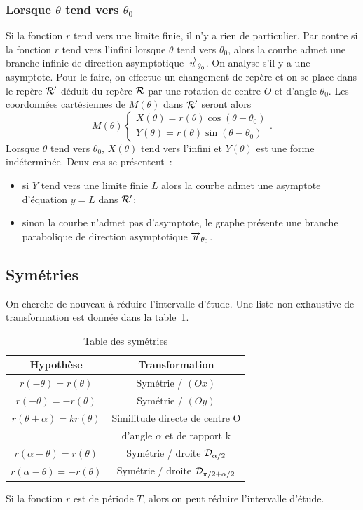 \subsubsection{Lorsque \(\theta\) tend vers \(\theta_0\)}
Si la fonction \(r\) tend vers une limite finie, il n'y a rien de particulier. 
Par contre si la fonction \(r\) tend vers l'infini lorsque \(\theta\) tend vers 
\(\theta_0\), alors la courbe admet une branche infinie de direction 
asymptotique \(\overrightarrow{u}_{\theta_0}\). On analyse s'il y a une asymptote. Pour le 
faire, on effectue un changement de repère et on se place dans le repère 
\(\mathcal{R}'\) déduit du repère \(\mathcal{R}\) par une rotation de centre \(O\) et d'angle 
\(\theta_0\). Les coordonnées cartésiennes de \(M(\theta)\) dans \(\mathcal{R}'\) 
seront alors
\begin{equation}
  M(\theta)
  \begin{cases}
    X(\theta)=r(\theta)\cos(\theta-\theta_0)\\
    Y(\theta)=r(\theta)\sin(\theta-\theta_0)
  \end{cases}.
\end{equation}
Lorsque \(\theta\) tend vers \(\theta_0\), \(X(\theta)\) tend vers l'infini et 
\(Y(\theta)\) est une forme indéterminée. Deux cas se présentent~:
\begin{itemize}
  \item si \(Y\) tend vers une limite finie \(L\) alors la courbe admet une 
    asymptote d'équation \(y = L\) dans \(\mathcal{R}'\);
  \item sinon la courbe n'admet pas d'asymptote, le graphe présente une branche 
    parabolique de direction asymptotique \(\overrightarrow{u}_{\theta_0}\).
\end{itemize}

\subsection{Symétries}
On cherche de nouveau à réduire l'intervalle d'étude. Une liste non exhaustive 
de transformation est donnée dans la table~\ref{tab:sympol}.
\begin{table}
  \centering
  \begin{tabular}{|c|c|}    
    \hline
    Hypothèse & Transformation \\
    \hline
    \(r(-\theta)=r(\theta)\) & Symétrie / \((Ox)\) \\
    \hline
    \(r(-\theta)=-r(\theta)\) & Symétrie / \((Oy)\) \\
    \hline
    \(r(\theta + \alpha)=kr(\theta)\) & Similitude directe de centre O \\ & 
    d'angle \(\alpha\) et de rapport k \\ 
    \hline
    \(r(\alpha-\theta)=r(\theta)\) & Symétrie / droite \(\mathcal{D}_{\alpha/2}\) \\ 
    \hline
    \(r(\alpha-\theta)=-r(\theta)\) & Symétrie / droite \(\mathcal{D}_{\pi/2 + 
    \alpha/2}\) \\
    \hline
  \end{tabular}
  \caption{Table des symétries}
  \label{tab:sympol}
\end{table}
Si la fonction \(r\) est de période \(T\), alors on peut réduire l'intervalle 
d'étude.
